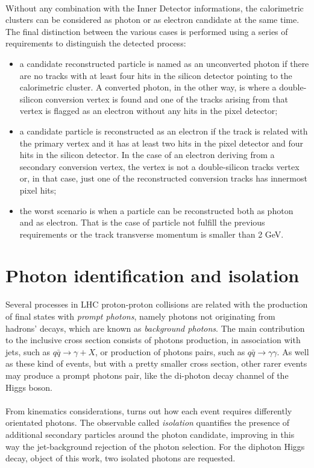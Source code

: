 \\Without any combination with the Inner Detector informations, the calorimetric clusters can be considered as photon or as electron candidate at the same time. The final distinction between the various cases is performed using a series of requirements to distinguish the detected process:
\begin{itemize}
\item a candidate reconstructed particle is named as an unconverted photon if there are no tracks with at least four hits in the silicon detector pointing to the calorimetric cluster. A converted photon, in the other way, is where a double-silicon conversion vertex is found and one of the tracks arising from that vertex is flagged as an electron without any hits in the pixel detector;
\item a candidate particle is reconstructed as an electron if the track is related with the primary vertex and it has at least two hits in the pixel detector and four hits in the silicon detector. In the case of an electron deriving from a secondary conversion vertex, the vertex is not a double-silicon tracks vertex or, in that case, just one of the reconstructed conversion tracks has innermost pixel hits;
\item the worst scenario is when a particle can be reconstructed both as photon and as electron. That is the case of particle not fulfill the previous requirements or the track transverse momentum is smaller than 2 GeV.
\end{itemize}

\section{Photon identification and isolation}
Several processes in LHC proton-proton collisions are related with the production of final states with \emph{prompt photons}, namely photons not originating from hadrons' decays, which are known as \emph{background photons}. The main contribution to the inclusive cross section consists of photons production, in association with jets, such as $q\bar{q} \rightarrow \gamma + X$, or production of photons pairs, such as $q\bar{q} \rightarrow \gamma \gamma$. As well as these kind of events, but with a pretty smaller cross section, other rarer events may produce a prompt photons pair, like the di-photon decay channel of the Higgs boson.
\\\\
From kinematics considerations, turns out how each event requires differently orientated photons. The observable called \emph{isolation} quantifies the presence of additional secondary particles around the photon candidate, improving in this way the jet-background rejection of the photon selection. For the diphoton Higgs decay, object of this work, two isolated photons are requested.

